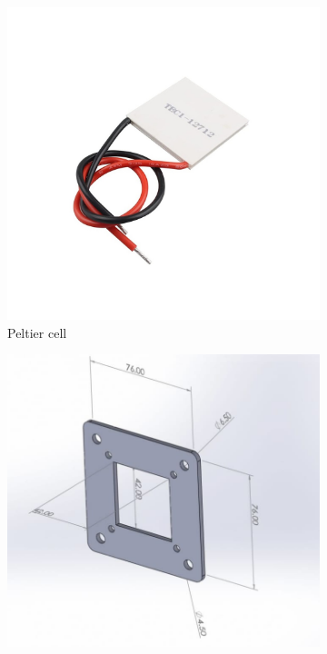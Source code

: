 \documentclass[12pt]{article}
\begin{document}
\begin{figure}[htp]
    \begin{subfigure}[b]{0.3\textwidth}
    \centering
    \includegraphics[width=\textwidth]{Images/peltier.jpg}
    \caption{Peltier cell}
    \end{subfigure}
    \hfill
    \begin{subfigure}[b]{0.3\textwidth}
        \centering
        \includegraphics[width=\textwidth]{Images/Peltierbase2.jpeg}

\end{subfigure}
\end{figure}
\end{document}
